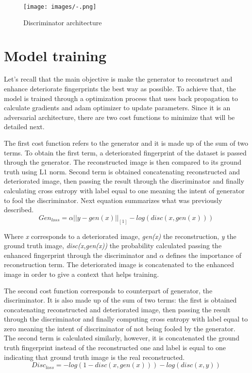 \documentclass[a4paper,fleqn]{cas-dc}
\begin{document}
\begin{figure}[htbp]
\centerline{\texttt{[image: images/-.png]}}
\caption{Discriminator architecture}
\label{fig5}
\end{figure}

\section{Model training}
\label{sec:MT}

Let's recall that the main objective is make the generator to reconstruct and enhance deteriorate fingerprints the best way as possible. To achieve that, the model is trained through a optimization process that uses back propagation to calculate gradients and adam optimizer to update parameters. Since it is an adversarial architecture, there are two cost functions to minimize that will be detailed next.

The first cost function refers to the generator and it is made up of the sum of two terms. To obtain the first term, a deteriorated fingerprint of the dataset is passed through the generator. The reconstructed image is then compared to its ground truth using L1 norm. Second term is obtained concatenating reconstructed and deteriorated image, then passing the result through the discriminator and finally calculating cross entropy with label equal to one meaning the intent of generator to fool the discriminator. Next equation summarizes what was previously described.
\begin{equation}
Gen_{loss} = \alpha||y-gen(x)||_{[1]} - log(disc(x,gen(x)))
\end{equation}

Where \textit{x} corresponds to a deteriorated image, \textit{gen(x)} the reconstruction, \textit{y} the ground truth image, \textit{disc(x,gen(x))} the probability calculated passing the enhanced fingerprint through the discriminator and $\alpha$ defines the importance of reconstruction term. The deteriorated image is concatenated to the enhanced image in order to give a context that helps training.

The second cost function corresponds to counterpart of generator, the discriminator. It is also made up of the sum of two terms: the first is obtained concatenating reconstructed and deteriorated image, then passing the result through the discriminator and finally computing cross entropy with label equal to zero meaning the intent of discriminator of not being fooled by the generator. The second term is calculated similarly, however, it is concatenated the ground truth fingerprint instead of the reconstructed one and label is equal to one indicating that ground truth image is the real reconstructed.
\begin{equation}
Disc_{loss} = -log(1-disc(x,gen(x)))-log(disc(x,y))
\end{equation}
\end{document}
